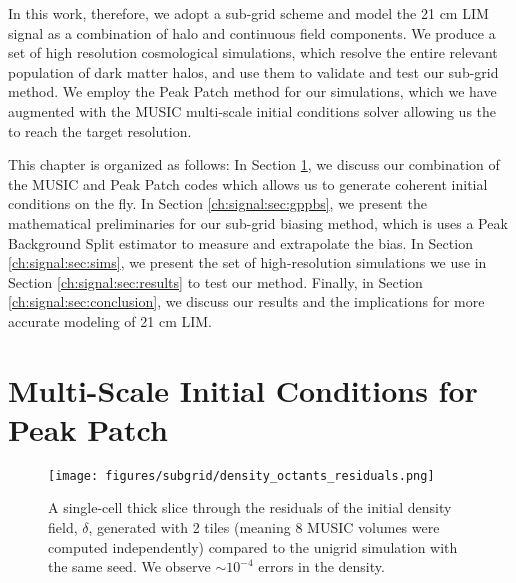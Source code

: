 In this work, therefore, we adopt a sub-grid scheme and model the 21 cm LIM signal as a combination of halo and continuous field components. We produce a set of high resolution cosmological simulations, which resolve the entire relevant population of dark matter halos, and use them to validate and test our sub-grid method. We employ the Peak Patch \citep{peakpatch1} method for our simulations, which we have augmented with the MUSIC multi-scale initial conditions solver allowing us the to reach the target resolution. 

This chapter is organized as follows: In Section \ref{ch:signal:sec:music}, we discuss our combination of the MUSIC and Peak Patch codes which allows us to generate coherent initial conditions on the fly. In Section \ref{ch:signal:sec:gppbs}, we present the mathematical preliminaries for our sub-grid biasing method, which is uses a Peak Background Split \citep{biasreview} estimator to measure and extrapolate the bias. In Section \ref{ch:signal:sec:sims}, we present the set of high-resolution simulations we use in Section \ref{ch:signal:sec:results} to test our method. Finally, in Section \ref{ch:signal:sec:conclusion}, we discuss our results and the implications for more accurate modeling of 21 cm LIM.

\section{Multi-Scale Initial Conditions for Peak Patch}
\label{ch:signal:sec:music}

\begin{figure} %
\begin{center}
\texttt{[image: figures/subgrid/density\_octants\_residuals.png]}%
\caption{A single-cell thick slice through the residuals of the initial density field, $\delta$, generated with 2 tiles (meaning 8 MUSIC volumes were computed independently) compared to the unigrid simulation with the same seed. We observe $\sim 10^{-4}$ errors in the density.}
\label{density_octants_residuals}
\end{center}
\end{figure}

